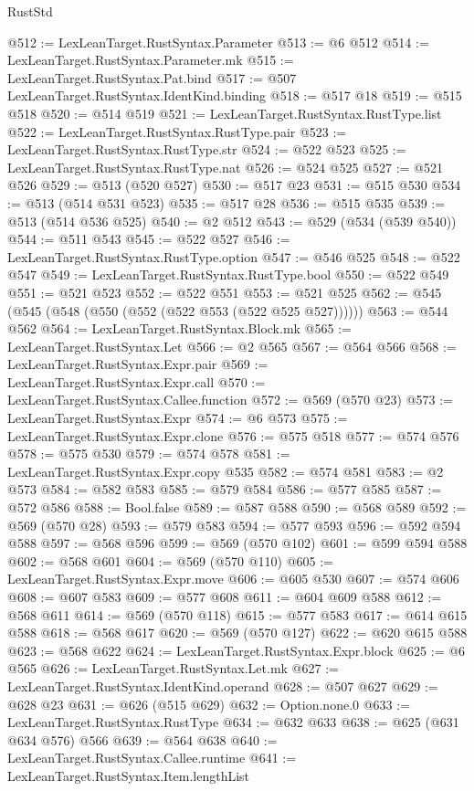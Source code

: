 \begin{lexlean}{RustStd}
\begin{coremodule}
{\begin{coremodule}
{{{{{{{{{{{{{{{@512 := LexLeanTarget.RustSyntax.Parameter
@513 := @6 @512
@514 := LexLeanTarget.RustSyntax.Parameter.mk
@515 := LexLeanTarget.RustSyntax.Pat.bind
@517 := @507 LexLeanTarget.RustSyntax.IdentKind.binding
@518 := @517 @18
@519 := @515 @518
@520 := @514 @519
@521 := LexLeanTarget.RustSyntax.RustType.list
@522 := LexLeanTarget.RustSyntax.RustType.pair
@523 := LexLeanTarget.RustSyntax.RustType.str
@524 := @522 @523
@525 := LexLeanTarget.RustSyntax.RustType.nat
@526 := @524 @525
@527 := @521 @526
@529 := @513 (@520 @527)
@530 := @517 @23
@531 := @515 @530
@534 := @513 (@514 @531 @523)
@535 := @517 @28
@536 := @515 @535
@539 := @513 (@514 @536 @525)
@540 := @2 @512
@543 := @529 (@534 (@539 @540))
@544 := @511 @543
@545 := @522 @527
@546 := LexLeanTarget.RustSyntax.RustType.option
@547 := @546 @525
@548 := @522 @547
@549 := LexLeanTarget.RustSyntax.RustType.bool
@550 := @522 @549
@551 := @521 @523
@552 := @522 @551
@553 := @521 @525
@562 := @545 (@545 (@548 (@550 (@552 (@522 @553 (@522 @525 @527))))))
@563 := @544 @562
@564 := LexLeanTarget.RustSyntax.Block.mk
@565 := LexLeanTarget.RustSyntax.Let
@566 := @2 @565
@567 := @564 @566
@568 := LexLeanTarget.RustSyntax.Expr.pair
@569 := LexLeanTarget.RustSyntax.Expr.call
@570 := LexLeanTarget.RustSyntax.Callee.function
@572 := @569 (@570 @23)
@573 := LexLeanTarget.RustSyntax.Expr
@574 := @6 @573
@575 := LexLeanTarget.RustSyntax.Expr.clone
@576 := @575 @518
@577 := @574 @576
@578 := @575 @530
@579 := @574 @578
@581 := LexLeanTarget.RustSyntax.Expr.copy @535
@582 := @574 @581
@583 := @2 @573
@584 := @582 @583
@585 := @579 @584
@586 := @577 @585
@587 := @572 @586
@588 := Bool.false
@589 := @587 @588
@590 := @568 @589
@592 := @569 (@570 @28)
@593 := @579 @583
@594 := @577 @593
@596 := @592 @594 @588
@597 := @568 @596
@599 := @569 (@570 @102)
@601 := @599 @594 @588
@602 := @568 @601
@604 := @569 (@570 @110)
@605 := LexLeanTarget.RustSyntax.Expr.move
@606 := @605 @530
@607 := @574 @606
@608 := @607 @583
@609 := @577 @608
@611 := @604 @609 @588
@612 := @568 @611
@614 := @569 (@570 @118)
@615 := @577 @583
@617 := @614 @615 @588
@618 := @568 @617
@620 := @569 (@570 @127)
@622 := @620 @615 @588
@623 := @568 @622
@624 := LexLeanTarget.RustSyntax.Expr.block
@625 := @6 @565
@626 := LexLeanTarget.RustSyntax.Let.mk
@627 := LexLeanTarget.RustSyntax.IdentKind.operand
@628 := @507 @627
@629 := @628 @23
@631 := @626 (@515 @629)
@632 := Option.none.{0}
@633 := LexLeanTarget.RustSyntax.RustType
@634 := @632 @633
@638 := @625 (@631 @634 @576) @566
@639 := @564 @638
@640 := LexLeanTarget.RustSyntax.Callee.runtime
@641 := LexLeanTarget.RustSyntax.Item.lengthList
}}}}}}}}}}}}}}}
\end{coremodule}}
\end{coremodule}
\end{lexlean}
